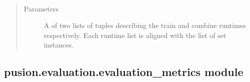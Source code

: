 \documentclass[letterpaper,10pt,english]{sphinxmanual}
\begin{document}
\begin{fulllineitems}

\begin{fulllineitems}
\label{\detokenize{pusion.evaluation.evaluation:pusion.evaluation.evaluation.Evaluation.set_runtimes}}~\begin{quote}\begin{description}
\item[{Parameters}] \leavevmode
\sphinxAtStartPar
{} \textendash{} A  of two lists of tuples describing the train and combine runtimes respectively.
Each runtime list is aligned with the list of set instances.

\end{description}\end{quote}

\end{fulllineitems}


\end{fulllineitems}



\subsection{pusion.evaluation.evaluation\_metrics module}
\label{\detokenize{pusion.evaluation.evaluation_metrics:module-pusion.evaluation.evaluation_metrics}}\label{\detokenize{pusion.evaluation.evaluation_metrics:pusion-evaluation-evaluation-metrics-module}}\label{\detokenize{pusion.evaluation.evaluation_metrics::doc}}
\end{document}
